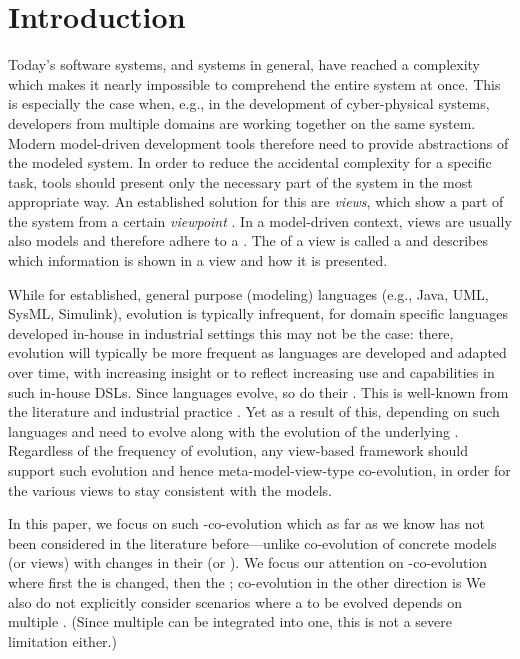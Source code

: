 \section{Introduction}
\label{sec:Introduction}

Today's software systems, and systems in general, have reached a complexity which makes it nearly impossible to comprehend the entire system at once.
This is especially the case when, e.g., in the development of cyber-physical systems, developers from multiple domains are working together on the same system.
Modern model-driven development tools therefore need to provide abstractions of the modeled system.
In order to reduce the accidental complexity for a specific task, tools should present only the necessary part of the system in the most appropriate way.
An established solution for this are \emph{views}, which show a part of the system from a certain \emph{viewpoint} \autocite{atkinson_orthographic_2010}.
In a model-driven context, views are usually also models and therefore adhere to a \metamodel.
The \metamodel of a view is called a \viewtype \autocite{goldschmidt_towards_2012} and describes which information is shown in a view and how it is presented.

While for established, general purpose (modeling) languages (e.g., Java, UML, SysML, Simulink), evolution is typically infrequent, for domain specific languages developed in-house in industrial settings this may not be the case: there, evolution will typically be more frequent as languages are developed and adapted over time, with increasing insight or to reflect increasing use and capabilities in such in-house DSLs. Since languages evolve, so do their \metamodels. This is well-known from the literature and industrial practice \cite{durisic_evolution_2014}. Yet as a result of this, \viewtypes depending on such languages and \metamodels need to evolve along with the evolution of the underlying \metamodels. Regardless of the frequency of \metamodel evolution, any view-based framework should support such evolution and hence meta-model-view-type co-evolution, in order for the various views to stay consistent with the models. 

In this paper, we focus on such \metamodel-\viewtype co-evolution which as far as we know has not been considered in the literature before---unlike co-evolution of concrete models (or views) with changes in their \metamodel (or \viewtype). We focus our attention on \metamodel-\viewtype co-evolution where first the \metamodel is changed, then the \viewtype; co-evolution in the other direction is We also do not explicitly consider scenarios where a \viewtype to be evolved depends on multiple \metamodels. (Since multiple \metamodels can be integrated into one, this is not a severe limitation either.)


